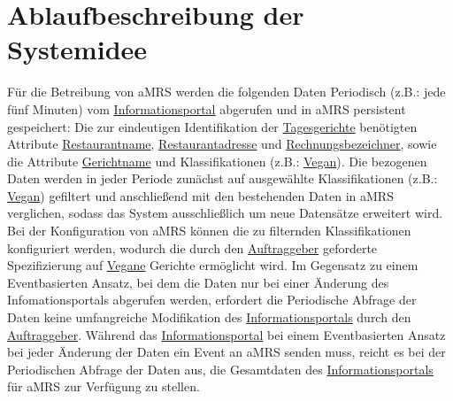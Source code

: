 \section{Ablaufbeschreibung der Systemidee}\label{cha:AblaufbeschreibungderSystemidee}
Für die Betreibung von \ac{aMRS} werden die folgenden Daten Periodisch (z.B.: jede fünf Minuten) vom \hyperref[gls:informationsportal]{Informationsportal} abgerufen und in \ac{aMRS} persistent gespeichert:
Die zur eindeutigen Identifikation der \hyperref[gls:tagesgericht]{Tagesgerichte} benötigten Attribute \hyperref[gls:restaurantname]{Restaurantname}, \hyperref[gls:restaurantadresse]{Restaurantadresse} und \hyperref[gls:Rechnungsbezeichner]{Rechnungsbezeichner}, sowie die Attribute \hyperref[gls:gerichtname]{Gerichtname} und Klassifikationen (z.B.: \hyperref[gls:vegan]{Vegan}).
Die bezogenen Daten werden in jeder Periode zunächst auf ausgewählte Klassifikationen (z.B.: \hyperref[gls:vegan]{Vegan}) gefiltert und anschließend mit den bestehenden Daten in \ac{aMRS} verglichen, sodass das System ausschließlich um neue Datensätze erweitert wird.
Bei der Konfiguration von \ac{aMRS} können die zu filternden Klassifikationen konfiguriert werden, wodurch die durch den \hyperref[gls:auftraggeber]{Auftraggeber} geforderte Spezifizierung auf \hyperref[gls:vegan]{Vegane} Gerichte ermöglicht wird.
\newparagraph
Im Gegensatz zu einem Eventbasierten Ansatz, bei dem die Daten nur bei einer Änderung des Infomationsportals abgerufen werden, erfordert die Periodische Abfrage der Daten keine umfangreiche Modifikation des \hyperref[gls:informationsportal]{Informationsportals} durch den \hyperref[gls:auftraggeber]{Auftraggeber}.
Während das \hyperref[gls:informationsportal]{Informationsportal} bei einem Eventbasierten Ansatz bei jeder Änderung der Daten ein Event an \ac{aMRS} senden muss, reicht es bei der Periodischen Abfrage der Daten aus, die Gesamtdaten des \hyperref[gls:informationsportal]{Informationsportals} für \ac{aMRS} zur Verfügung zu stellen.
\newparagraph
